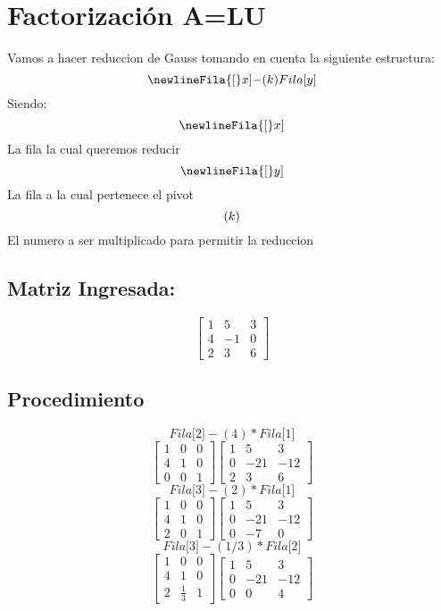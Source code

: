 \documentclass{article}%
\begin{document}
%
\normalsize%
\[%
%
\]%
\section{ Factorización A=LU }%
\label{sec:FactorizacinA=LU}%
Vamos a hacer reduccion de Gauss tomando en cuenta la siguiente estructura:%
\[%
\newline%
Fila{[}x{]}{-}(k)Fila{[}y{]}%
\]%
Siendo:%
\[%
\newline%
Fila{[}x{]}%
\]%
La fila la cual queremos reducir%
\[%
\newline%
Fila{[}y{]}%
\]%
La fila a la cual pertenece el pivot\newline%
%
\[%
\newline%
(k)%
\]%
El numero a ser multiplicado para permitir la reduccion\newline%
%
\subsection{Matriz Ingresada: }%
\label{subsec:MatrizIngresada}%
\[%
\left[\begin{matrix}1 & 5 & 3\\4 & -1 & 0\\2 & 3 & 6\end{matrix}\right]%
\]

%
\subsection{Procedimiento}%
\label{subsec:Procedimiento}%
\[%
Fila{[}2{]}{-}(4)*Fila{[}1{]}%
\]%
\[%
\left[\begin{matrix}1 & 0 & 0\\4 & 1 & 0\\0 & 0 & 1\end{matrix}\right] \left[\begin{matrix}1 & 5 & 3\\0 & -21 & -12\\2 & 3 & 6\end{matrix}\right]%
\]%
\[%
Fila{[}3{]}{-}(2)*Fila{[}1{]}%
\]%
\[%
\left[\begin{matrix}1 & 0 & 0\\4 & 1 & 0\\2 & 0 & 1\end{matrix}\right] \left[\begin{matrix}1 & 5 & 3\\0 & -21 & -12\\0 & -7 & 0\end{matrix}\right]%
\]%
\[%
Fila{[}3{]}{-}(1/3)*Fila{[}2{]}%
\]%
\[%
\left[\begin{matrix}1 & 0 & 0\\4 & 1 & 0\\2 & \frac{1}{3} & 1\end{matrix}\right] \left[\begin{matrix}1 & 5 & 3\\0 & -21 & -12\\0 & 0 & 4\end{matrix}\right]%
\]
\end{document}
